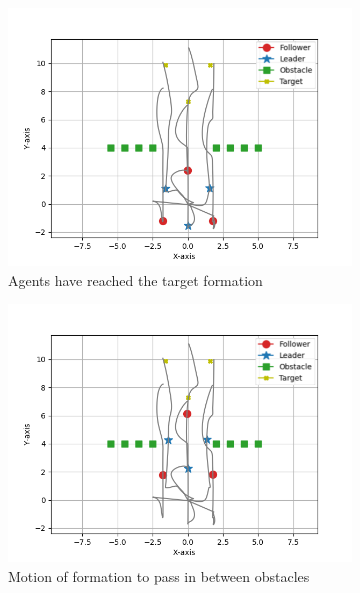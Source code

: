 \documentclass[a4paper,11pt,oneside]{book}
\begin{document}
\begin{figure}[h]
\centering
	\begin{subfigure}{0.5\textwidth}	
	\includegraphics[width=\textwidth]{Hexagon_obstacle_Initial.jpg}
	\caption{Agents have reached the target formation}
	\end{subfigure}
\vfill
	\begin{subfigure}{0.5\textwidth}	
	\includegraphics[width=\textwidth]{Hexagon_obstacle.jpg}
	\caption{Motion of formation to pass in between obstacles}
	\end{subfigure}
\vfill
	\begin{subfigure}{0.5\textwidth}	

\end{subfigure}
\end{figure}
\end{document}
